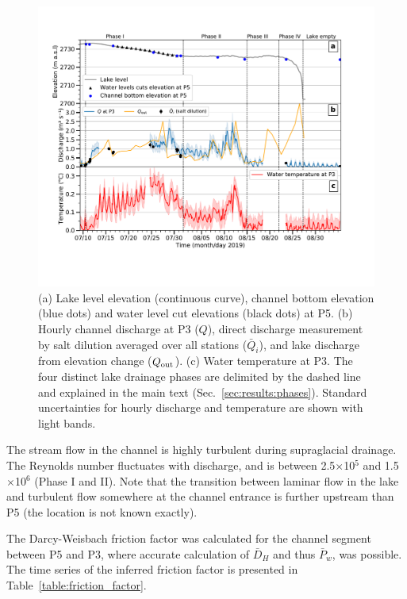 \begin{figure}[h]
    \centering
    \includegraphics[width=1\textwidth]{chapters/chapter_plainemorte/fig06.pdf}
    \caption{(a) Lake level elevation (continuous curve), channel bottom elevation (blue dots) and water level cut elevations (black dots) at P5. (b) Hourly channel discharge at P3 ($Q$), direct discharge measurement by salt dilution averaged over all stations ($\bar Q_i$), and lake discharge from elevation change ($Q_{\rm out}$). (c) Water temperature at P3. The four distinct lake drainage phases are delimited by the dashed line and explained in the main text (Sec.~\ref{sec:results:phases}). Standard uncertainties for hourly discharge and temperature are shown with light bands.}
    \label{fig:channel_discharge}
\end{figure}

The stream flow in the channel is highly turbulent during supraglacial drainage. The Reynolds number fluctuates with discharge, and is between 2.5$\times$10$^5$ and 1.5$\times$10$^6$  (Phase I and II). Note that the transition between laminar flow in the lake and turbulent flow somewhere at the channel entrance is further upstream than P5 (the location is not known exactly).

The Darcy-Weisbach friction factor was calculated for the channel segment between P5 and P3, where accurate calculation of $\bar D_H$ and thus $\bar P_w$, was possible. The time series of the inferred friction factor is presented in Table~\ref{table:friction_factor}.

